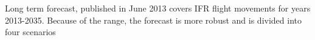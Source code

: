 %
%
%

Long term forecast, published in June 2013 covers IFR flight movements for years 2013-2035. Because of the range, the forecast is more robust and is divided into four scenarios \citep{growth_2013}

